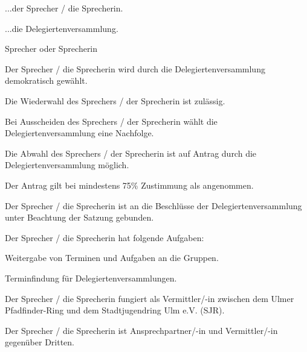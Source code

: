 \begin{legal}
\begin{legal}
\begin{legal}
                    \item ...der Sprecher / die Sprecherin.
                    \item ...die Delegiertenversammlung.
                \end{legal}
        \end{legal}
    \item Sprecher oder Sprecherin
        \begin{legal}
            \item Der Sprecher / die Sprecherin wird durch die Delegiertenversammlung 
                  demokratisch gewählt.
            \item Die Wiederwahl des Sprechers / der Sprecherin ist zulässig.
            \item Bei Ausscheiden des Sprechers / der Sprecherin wählt die Delegiertenversammlung 
                  eine Nachfolge.
            \item Die Abwahl des Sprechers / der Sprecherin ist auf Antrag durch die 
                  Delegiertenversammlung möglich.
                \begin{legal}
                    \item Der Antrag gilt bei mindestens 75\% Zustimmung als angenommen.
                \end{legal}
            \item Der Sprecher / die Sprecherin ist an die Beschlüsse der Delegiertenversammlung 
                  unter Beachtung der Satzung gebunden.
            \item Der Sprecher / die Sprecherin hat folgende Aufgaben:
                  \begin{legal}
                        \item Weitergabe von Terminen und Aufgaben an die Gruppen.
                        \item Terminfindung für Delegiertenversammlungen.
                  \end{legal}
            \item Der Sprecher / die Sprecherin fungiert als Vermittler/-in zwischen dem Ulmer 
                  Pfadfinder-Ring und dem Stadtjugendring Ulm e.V. (SJR).
            \item Der Sprecher / die Sprecherin ist Ansprechpartner/-in und Vermittler/-in 
                  gegenüber Dritten.

\end{legal}
\end{legal}
